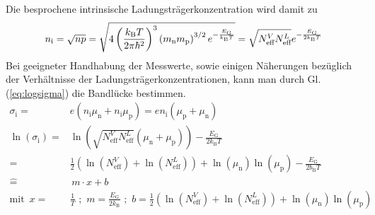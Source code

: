 \documentclass[numbers=noenddot,14pt,a4paper]{scrartcl}
\newcommand{\ix}[1]{_\text{#1}}
\newcommand{\euler}{\mathnormal{e}}
\begin{document}
Die besprochene intrinsische Ladungsträgerkonzentration wird damit zu
\begin{align}
	n\ix{i}=\sqrt{np}=\sqrt{4\left(\frac{k\ix{B}T}{2\pi\hbar^2}\right)^3\left(m\ix{n}m\ix{p}\right)^{3/2}\euler^{-\frac{E\ix{G}}{k\ix{B}T}}}=\sqrt{N^{V}\ix{eff}N^{L}\ix{eff}}\euler^{-\frac{E\ix{G}}{2k\ix{B}T}} \label{eq:intrin}
\end{align}
Bei geeigneter Handhabung der Messwerte, sowie einigen Näherungen bezüglich der Verhältnisse der Ladungsträgerkonzentrationen, kann man durch Gl. (\ref{eq:logsigma}) die Bandlücke bestimmen.
\begin{align}
	\sigma\ix{i}=&e\left(n\ix{i}\mu\ix{n}+n\ix{i}\mu\ix{p}\right)=en\ix{i}\left(\mu\ix{p}+\mu\ix{n}\right) \nonumber \\
	\ln{\left(\sigma\ix{i}\right)}=&\ln{\left(\sqrt{N^{V}\ix{eff}N^{L}\ix{eff}}\left(\mu\ix{n}+\mu\ix{p}\right)\right)}-\frac{E\ix{G}}{2k\ix{B}T} \nonumber \\
	=&\frac{1}{2}\left(\ln\left(N^{V}\ix{eff}\right)+\ln\left(N^{L}\ix{eff}\right)\right)+\ln\left(\mu\ix{n}\right)\ln\left(\mu\ix{p}\right)-\frac{E\ix{G}}{2b\ix{B}T} \label{eq:logsigma} \\
	\hat{=}&\,m\cdot x+b \nonumber \\
	\text{mit} \,\,\, x=&\frac{1}{T} \,\,;\,\, m=\frac{E\ix{G}}{2k\ix{B}} \,\,;\,\, b=\frac{1}{2}\left(\ln\left(N^{V}\ix{eff}\right)+\ln\left(N^{L}\ix{eff}\right)\right)+\ln\left(\mu\ix{n}\right)\ln\left(\mu\ix{p}\right) \nonumber
\end{align}
\end{document}
